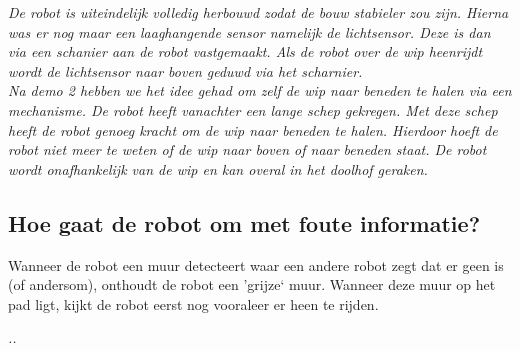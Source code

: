 \documentclass{peno}
\begin{document}
\textit{De robot is uiteindelijk volledig herbouwd zodat de bouw stabieler zou zijn. Hierna was er nog maar een laaghangende sensor namelijk de lichtsensor. Deze is dan via een schanier aan de robot vastgemaakt. Als de robot over de wip heenrijdt wordt de lichtsensor naar boven geduwd via het scharnier. \\
Na demo 2 hebben we het idee gehad om zelf de wip naar beneden te halen via een mechanisme. De robot heeft vanachter een lange schep gekregen. Met deze schep heeft de robot genoeg kracht om de wip naar beneden te halen. Hierdoor hoeft de robot niet meer te weten of de wip naar boven of naar beneden staat. De robot wordt onafhankelijk van de wip en kan overal in het doolhof geraken. }

\subsection*{Hoe gaat de robot om met foute informatie?}
Wanneer de robot een muur detecteert waar een andere robot zegt dat er geen is (of andersom), onthoudt de robot een 'grijze` muur. Wanneer deze muur op het pad ligt, kijkt de robot eerst nog vooraleer er heen te rijden.

\textit{..}
\end{document}
